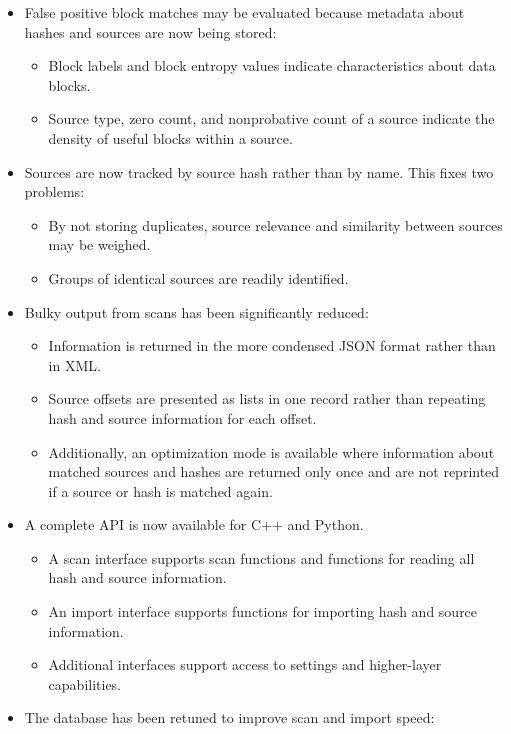 \documentclass[11pt,fleqn]{article} %
\begin{document}
\begin{itemize}
\item False positive block matches may be evaluated because metadata about hashes and sources are now being stored:
  \begin{itemize}
  \item Block labels and block entropy values indicate characteristics about data blocks.
  \item Source type, zero count, and nonprobative count of a source indicate the density of useful blocks within a source.
\end{itemize}
\item Sources are now tracked by source hash rather than by name.  This fixes two problems:
  \begin{itemize}
  \item By not storing duplicates, source relevance and similarity between sources may be weighed.
  \item Groups of identical sources are readily identified.
  \end{itemize}
\item Bulky output from scans has been significantly reduced:
  \begin{itemize}
  \item Information is returned in the more condensed JSON format rather than in XML.
  \item Source offsets are presented as lists in one record rather than repeating hash and source information for each offset.
  \item Additionally, an optimization mode is available where information about matched sources and hashes are returned only once and are not reprinted if a source or hash is matched again.
  \end{itemize}
\item A complete \hdb API is now available for C++ and Python.
  \begin{itemize}
  \item A scan interface supports scan functions and functions for reading all hash and source information.
  \item An import interface supports functions for importing hash and source information.
  \item Additional interfaces support access to settings and higher-layer capabilities.
  \end{itemize}
\item The database has been retuned to improve scan and import speed:
  \begin{itemize}

\end{itemize}
\end{itemize}
\end{document}
